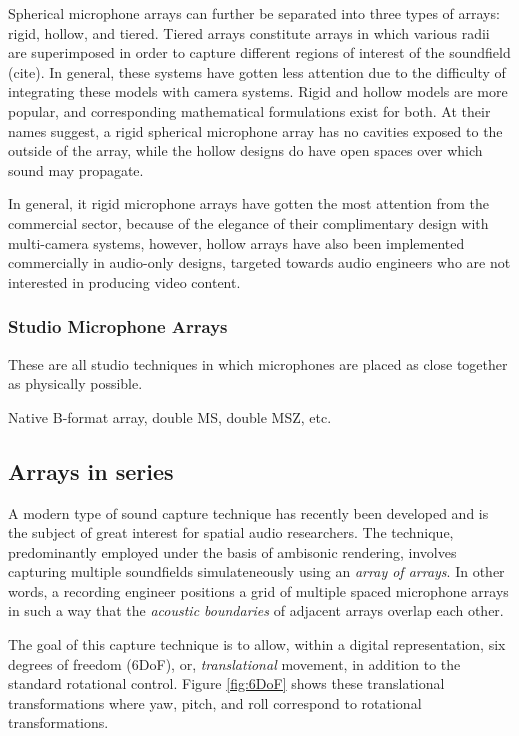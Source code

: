 Spherical microphone arrays can further be separated into three types of arrays: rigid, hollow, and tiered. Tiered arrays constitute arrays in which various radii are superimposed in order to capture different regions of interest of the soundfield (cite). In general, these systems have gotten less attention due to the difficulty of integrating these models with camera systems. Rigid and hollow models are more popular, and corresponding mathematical formulations exist for both. At their names suggest, a rigid spherical microphone array has no cavities exposed to the outside of the array, while the hollow designs do have open spaces over which sound may propagate.

In general, it rigid microphone arrays have gotten the most attention from the commercial sector, because of the elegance of their complimentary design with multi-camera systems, however, hollow arrays have also been implemented commercially in audio-only designs, targeted towards audio engineers who are not interested in producing video content. 

\subsubsection{Studio Microphone Arrays}
These are all studio techniques in which microphones are placed as close together as physically possible. 

Native B-format array, double MS, double MSZ, etc.

\subsection{Arrays in series}
A modern type of sound capture technique has recently been developed and is the subject of great interest for spatial audio researchers. The technique, predominantly employed under the basis of ambisonic rendering, involves capturing multiple soundfields simulateneously using an \textit{array of arrays}. In other words, a recording engineer positions a grid of multiple spaced microphone arrays in such a way that the \textit{acoustic boundaries} of adjacent arrays overlap each other. 

The goal of this capture technique is to allow, within a digital representation, six degrees of freedom (6DoF), or, \textit{translational} movement, in addition to the standard rotational control. Figure \ref{fig:6DoF} shows these translational transformations where yaw, pitch, and roll correspond to rotational transformations. 

